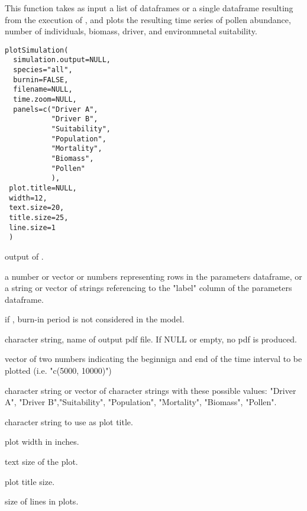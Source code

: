 \documentclass[letterpaper]{book}
\begin{document}
%
\begin{Description}\relax
This function takes as input a list of dataframes or a single dataframe resulting from the execution of , and plots the resulting time series of pollen abundance, number of individuals, biomass, driver, and environmnetal suitability.
\end{Description}
%
\begin{Usage}
\begin{verbatim}
plotSimulation(
  simulation.output=NULL,
  species="all",
  burnin=FALSE,
  filename=NULL,
  time.zoom=NULL,
  panels=c("Driver A",
           "Driver B",
           "Suitability",
           "Population",
           "Mortality",
           "Biomass",
           "Pollen"
           ),
 plot.title=NULL,
 width=12,
 text.size=20,
 title.size=25,
 line.size=1
 )
\end{verbatim}
\end{Usage}
%
\begin{Arguments}
\begin{ldescription}
\item[\code{simulation.output}] output of .

\item[\code{species}] a number or vector or numbers representing rows in the parameters dataframe, or a string or vector of strings referencing to the "label" column of the parameters dataframe.

\item[\code{burnin}] if , burn-in period is not considered in the model.

\item[\code{filename}] character string, name of output pdf file. If NULL or empty, no pdf is produced.

\item[\code{time.zoom}] vector of two numbers indicating the beginnign and end of the time interval to be plotted (i.e. "c(5000, 10000)")

\item[\code{panels}] character string or vector of character strings with these possible values: "Driver A", "Driver B","Suitability", "Population", "Mortality", "Biomass", "Pollen".

\item[\code{plot.title}] character string to use as plot title.

\item[\code{width}] plot width in inches.

\item[\code{text.size}] text size of the plot.

\item[\code{title.size}] plot title size.

\item[\code{line.size}] size of lines in plots.
\end{ldescription}
\end{Arguments}
\end{document}
